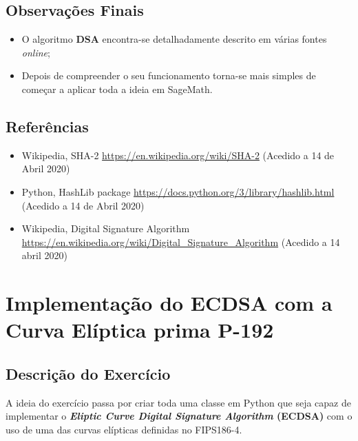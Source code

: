 \documentclass[12pt]{report}
\providecommand{\tightlist}{%
      \setlength{\itemsep}{0pt}\setlength{\parskip}{0pt}}
\begin{document}
    \subsection{Observações Finais}\label{observauxe7uxf5es-finais}

\begin{itemize}
\tightlist
\item
  O algoritmo \textbf{DSA} encontra-se detalhadamente descrito em várias
  fontes \emph{online};
\vspace{2 mm}
\item
  Depois de compreender o seu funcionamento torna-se mais simples de
  começar a aplicar toda a ideia em SageMath.
\end{itemize}

    \subsection{Referências}\label{referuxeancias}

\begin{itemize}
\tightlist
\item
  Wikipedia, SHA-2 \url{https://en.wikipedia.org/wiki/SHA-2} (Acedido a 14 de
  Abril 2020)
\vspace{2 mm}
\item
  Python, HashLib package \url{https://docs.python.org/3/library/hashlib.html}
  (Acedido a 14 de Abril 2020)
\vspace{2 mm}
\item
  Wikipedia, Digital Signature Algorithm
  \url{https://en.wikipedia.org/wiki/Digital\_Signature\_Algorithm} (Acedido a
  14 abril 2020)
\end{itemize}

\newpage

\section{Implementação do ECDSA com a Curva Elíptica prima
P-192}\label{implementauxe7uxe3o-do-ecdsa-com-a-curva-eluxedptica-prima-p-192}
\vspace{10 mm}
\subsection{Descrição do
Exercício}\label{descriuxe7uxe3o-do-exercuxedcio}
\vspace{2 mm}
A ideia do exercício passa por criar toda uma classe em Python que seja
capaz de implementar o \textbf{\emph{Eliptic Curve Digital Signature
Algorithm} (ECDSA)} com o uso de uma das curvas elípticas definidas no
FIPS186-4.
\end{document}

